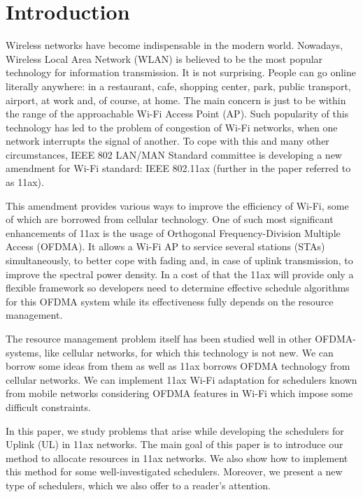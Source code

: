 \section{Introduction}

Wireless networks have become indispensable in the modern world.
Nowadays, Wireless Local Area Network (WLAN) is believed to be the most popular technology for information transmission. 
It is not surprising. 
People can go online literally anywhere: in a restaurant, cafe, shopping center, park, public transport, airport, at work and, of course, at home. 
\textcolor{prpl}{The main concern is just to be within the range of the approachable Wi-Fi Access Point (AP).} 
Such popularity of this technology has led to the problem of congestion of Wi-Fi networks, when one network interrupts the signal of another. 
To cope with this and many other circumstances, IEEE 802 LAN/MAN Standard committee is developing a new amendment for Wi-Fi standard: IEEE 802.11ax (further in the paper referred to as 11ax). 

This amendment provides various ways to improve the efficiency of Wi-Fi, some of which are borrowed from cellular technology.
One of such most significant enhancements of 11ax is the usa\-ge of Orthogonal Frequency-Division Multiple Access (OFDMA). 
It allows a Wi-Fi AP to service several stations (STAs) simultaneously, to better cope with fading and, in case of uplink transmission, to improve the spectral power density. 
In a cost of that the 11ax will provide only a flexible framework so developers need to determine effective schedule algorithms for this OFDMA system while its effectiveness fully depends on the resource management.   

The resource management problem itself has been studied well in other OFDMA-systems, like cellular networks, for which this technology is not new. 
We can borrow some ideas from them as well as 11ax borrows OFDMA technology from cellular networks. 
We can implement 11ax Wi-Fi adaptation for schedulers known from mobile networks considering OFDMA features in Wi-Fi which impose some difficult constraints.  

In this paper, we study problems that arise while developing the schedulers for Uplink (UL) in 11ax networks. The main goal of this paper is to introduce our method to allocate resources in 11ax networks. We also show how to implement this method for some well-investigated schedulers. 
Moreover, \textcolor{prpl}{we present a new type of schedulers, which we also offer to a reader's attention}.

